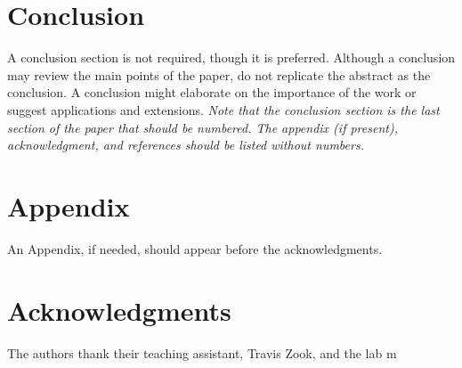 \documentclass[conf]{new-aiaa}
\begin{document}
\section{Conclusion}

    A conclusion section is not required, though it is preferred. Although a conclusion may review the main points of the paper, do not replicate the abstract as the conclusion. A conclusion might elaborate on the importance of the work or suggest applications and extensions. \textit{Note that the conclusion section is the last section of the paper that should be numbered. The appendix (if present), acknowledgment, and references should be listed without numbers.}


\section*{Appendix}

    An Appendix, if needed, should appear before the acknowledgments.

\section*{Acknowledgments}

    The authors thank their teaching assistant, Travis Zook, and the lab m


\end{document}
